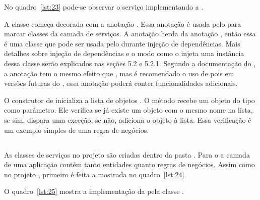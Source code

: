 
No quadro~\ref{lst:23} pode-se observar o serviço  implementando a  .


A classe  começa decorada com a anotação . Essa anotação é usada pelo  para marcar classes da camada de serviços. A anotação  herda da anotação , então essa é uma classe que pode ser usada pelo  durante injeção de dependências. Mais detalhes sobre injeção de dependências e o modo como o  injeta uma instância dessa classe serão explicados nas seções 5.2 e 5.2.1. Segundo a documentação do , a anotação  tem o mesmo efeito que , mas é recomendado o uso de  pois em versões futuras do , essa anotação poderá conter funcionalidades adicionais.

O construtor de  inicializa a lista de objetos . O método  recebe um objeto do tipo  como parâmetro. Ele verifica se já existe um objeto com o mesmo nome na lista, se sim, dispara uma exceção, se não, adiciona o objeto à lista. Essa verificação é um exemplo simples de uma regra de negócios.

\subsection{}

As classes de serviços no projeto  são criadas dentro da pasta . Para o  a camada  de uma aplicação  contém tanto entidades quanto regras de negócios. Assim como no projeto , primeiro é feita a   mostrada no quadro~\ref{lst:24}.


O quadro~\ref{lst:25} mostra a implementação da  pela classe .


